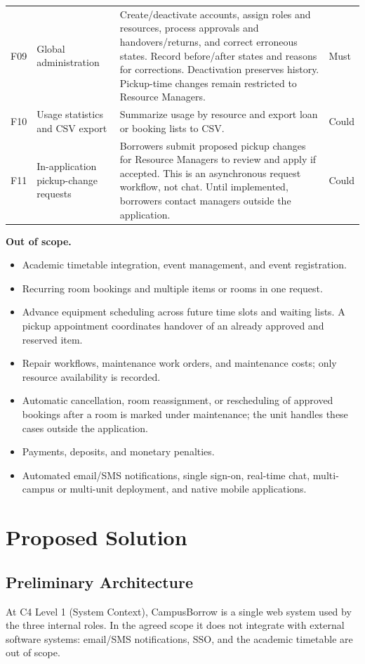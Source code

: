 \documentclass[11pt]{article}
\begin{document}
\begin{longtable}{@{}L{0.75cm}L{3.2cm}L{9.45cm}L{1.65cm}@{}}
F09 & Global administration & Create/deactivate accounts, assign roles and resources, process approvals and handovers/returns, and correct erroneous states. Record before/after states and reasons for corrections. Deactivation preserves history. Pickup-time changes remain restricted to Resource Managers. & Must \\
F10 & Usage statistics and CSV export & Summarize usage by resource and export loan or booking lists to CSV. & Could \\
F11 & In-application pickup-change requests & Borrowers submit proposed pickup changes for Resource Managers to review and apply if accepted. This is an asynchronous request workflow, not chat. Until implemented, borrowers contact managers outside the application. & Could \\
\bottomrule
\end{longtable}

\textbf{Out of scope.}
\begin{itemize}
  \item Academic timetable integration, event management, and event registration.
  \item Recurring room bookings and multiple items or rooms in one request.
  \item Advance equipment scheduling across future time slots and waiting lists. A pickup appointment coordinates handover of an already approved and reserved item.
  \item Repair workflows, maintenance work orders, and maintenance costs; only resource availability is recorded.
  \item Automatic cancellation, room reassignment, or rescheduling of approved bookings after a room is marked under maintenance; the unit handles these cases outside the application.
  \item Payments, deposits, and monetary penalties.
  \item Automated email/SMS notifications, single sign-on, real-time chat, multi-campus or multi-unit deployment, and native mobile applications.
\end{itemize}

\section{Proposed Solution}

\subsection{Preliminary Architecture}
At C4 Level 1 (System Context), CampusBorrow is a single web system used by the three internal roles. In the agreed scope it does not integrate with external software systems: email/SMS notifications, SSO, and the academic timetable are out of scope.
\end{document}
